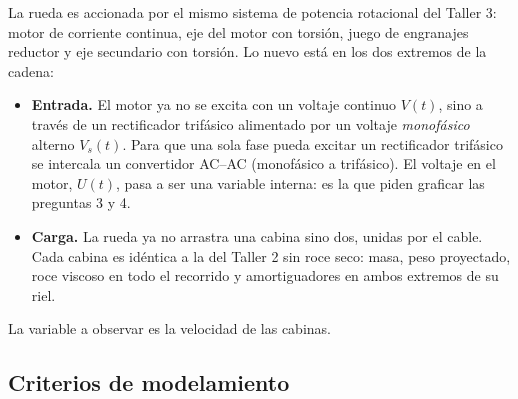 \documentclass[10pt,a4paper,twocolumn]{article}
\begin{document}
La rueda es accionada por el mismo sistema de potencia rotacional del Taller 3: motor de
corriente continua, eje del motor con torsión, juego de engranajes reductor y eje
secundario con torsión. Lo nuevo está en los dos extremos de la cadena:
\begin{itemize}
  \item \textbf{Entrada.} El motor ya no se excita con un voltaje continuo $V(t)$, sino a
        través de un rectificador trifásico alimentado por un voltaje \emph{monofásico}
        alterno $V_s(t)$. Para que una sola fase pueda excitar un rectificador trifásico
        se intercala un convertidor AC--AC (monofásico a trifásico). El voltaje en el
        motor, $U(t)$, pasa a ser una variable interna: es la que piden graficar las
        preguntas 3 y 4.
  \item \textbf{Carga.} La rueda ya no arrastra una cabina sino dos, unidas por el cable.
        Cada cabina es idéntica a la del Taller 2 sin roce seco: masa, peso proyectado,
        roce viscoso en todo el recorrido y amortiguadores en ambos extremos de su riel.
\end{itemize}
La variable a observar es la velocidad de las cabinas.

\subsection*{Criterios de modelamiento}
\end{document}
